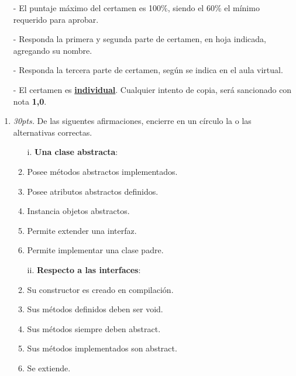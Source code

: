 \documentclass[10pt]{article}
\begin{document}
	{\scriptsize
	\begin{itemize}
		\item[-] El puntaje m\'aximo del certamen es 100\%, siendo el 60\% el m\'inimo requerido para aprobar.
		\item[-] Responda la primera y segunda parte de certamen, en hoja indicada, agregando su nombre.
		\item[-] Responda la tercera parte de certamen, seg\'un se indica en el aula virtual.
		\item[-] El certamen es \underline{\textbf{individual}}. Cualquier intento de copia, ser\'a sancionado con nota \textbf{1,0}.
	\end{itemize}
	
	\vspace*{-20pt}

	\begin{enumerate}

		\item \emph{30pts.} De las siguentes afirmaciones, encierre en un c\'irculo la o las alternativas correctas.
		
		\begin{multicols}{2}

			\begin{enumerate}[label=(\alph*)]
				\item[i.] \textbf{Una clase abstracta}:
				\item Posee m\'etodos abstractos implementados.
				\item Posee atributos abstractos definidos.
				\item Instancia objetos abstractos.
				\item Permite extender una interfaz.
				\item Permite implementar una clase padre.
			\end{enumerate}

            \begin{enumerate}[label=(\alph*)]
				\item[ii.] \textbf{Respecto a las interfaces}:
				\item Su constructor es creado en compilaci\'on.
				\item Sus m\'etodos definidos deben ser void.
				\item Sus m\'etodos siempre deben abstract.
				\item Sus m\'etodos implementados son abstract.
				\item Se extiende.
			\end{enumerate}


\end{multicols}
\end{enumerate}}
\end{document}
